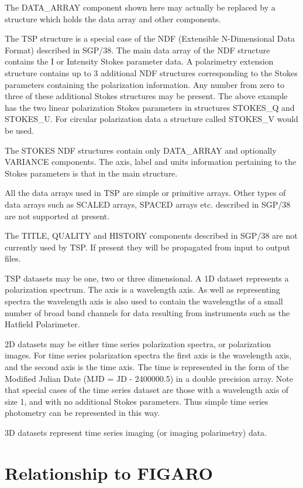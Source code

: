The DATA\_ARRAY component shown here may actually be replaced by a structure
which holds the data array and other components.

The TSP structure is a special case of the NDF (Extensible N-Dimensional
Data Format) described in SGP/38. The main data array of the NDF structure
contains the I or Intensity Stokes parameter data. A polarimetry extension
structure contains up to 3 additional NDF structures corresponding to the
Stokes parameters containing the polarization information. Any number from
zero to three of these additional Stokes structures may be present. The
above example has the two linear polarization Stokes parameters in structures
STOKES\_Q and STOKES\_U. For circular polarization data
a structure called STOKES\_V would be used.

The STOKES NDF structures contain only DATA\_ARRAY and optionally VARIANCE
components. The axis, label and units information pertaining to the Stokes
parameters is that in the main structure.

All the data arrays used in TSP are simple or primitive arrays. Other types
of data arrays such as SCALED arrays, SPACED arrays etc. described in SGP/38
are not supported at present.

The TITLE, QUALITY and HISTORY components described in SGP/38 are not
currently used by TSP. If present they will be propagated from input to
output files.

TSP datasets may be one, two or three dimensional. A 1D dataset represents
a polarization spectrum. The axis is a wavelength axis. As well as representing
spectra the wavelength axis is also used to contain the wavelengths of a
small number of broad band channels for data resulting from instruments
such as the Hatfield Polarimeter.

2D datasets may be either time series polarization spectra, or polarization images. For time series polarization spectra the first axis
is the wavelength axis, and the second axis is the time axis. The time is
represented in the form of the Modified Julian Date (MJD = JD - 2400000.5)
in a double precision array. Note that special cases of the time series
dataset are those with a wavelength axis of size 1, and with no additional
Stokes parameters. Thus simple time series photometry can be represented
in this way.

3D datasets represent time series imaging (or imaging polarimetry) data.

\section{Relationship to FIGARO}

